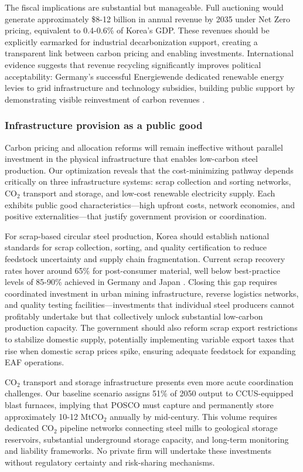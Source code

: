\documentclass[preprint,1p,authoryear]{elsarticle}
\begin{document}
The fiscal implications are substantial but manageable. Full auctioning would generate approximately \$8-12 billion in annual revenue by 2035 under Net Zero pricing, equivalent to 0.4-0.6\% of Korea's GDP. These revenues should be explicitly earmarked for industrial decarbonization support, creating a transparent link between carbon pricing and enabling investments. International evidence suggests that revenue recycling significantly improves political acceptability: Germany's successful Energiewende dedicated renewable energy levies to grid infrastructure and technology subsidies, building public support by demonstrating visible reinvestment of carbon revenues \citep{Otto2017}.

\subsubsection{Infrastructure provision as a public good}

Carbon pricing and allocation reforms will remain ineffective without parallel investment in the physical infrastructure that enables low-carbon steel production. Our optimization reveals that the cost-minimizing pathway depends critically on three infrastructure systems: scrap collection and sorting networks, CO$_2$ transport and storage, and low-cost renewable electricity supply. Each exhibits public good characteristics—high upfront costs, network economies, and positive externalities—that justify government provision or coordination.

For scrap-based circular steel production, Korea should establish national standards for scrap collection, sorting, and quality certification to reduce feedstock uncertainty and supply chain fragmentation. Current scrap recovery rates hover around 65\% for post-consumer material, well below best-practice levels of 85-90\% achieved in Germany and Japan \citep{pauliuk2013global}. Closing this gap requires coordinated investment in urban mining infrastructure, reverse logistics networks, and quality testing facilities—investments that individual steel producers cannot profitably undertake but that collectively unlock substantial low-carbon production capacity. The government should also reform scrap export restrictions to stabilize domestic supply, potentially implementing variable export taxes that rise when domestic scrap prices spike, ensuring adequate feedstock for expanding EAF operations.

CO$_2$ transport and storage infrastructure presents even more acute coordination challenges. Our baseline scenario assigns 51\% of 2050 output to CCUS-equipped blast furnaces, implying that POSCO must capture and permanently store approximately 10-12 MtCO$_2$ annually by mid-century. This volume requires dedicated CO$_2$ pipeline networks connecting steel mills to geological storage reservoirs, substantial underground storage capacity, and long-term monitoring and liability frameworks. No private firm will undertake these investments without regulatory certainty and risk-sharing mechanisms.
\end{document}
